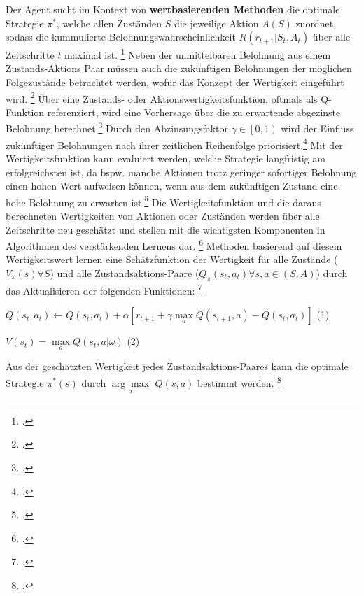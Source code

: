 Der Agent sucht im Kontext von \textbf{wertbasierenden Methoden} die optimale Strategie $\pi^{*}$, welche allen Zuständen $S$ die jeweilige Aktion $A(S)$ zuordnet, sodass die kummulierte Belohnungswahrscheinlichkeit $R(r_{t+1}|S_{t},A_{t})$ über alle Zeitschritte $t$ maximal ist. \footcite[Vgl.][S. 2]{Reda.2020}
Neben der unmittelbaren Belohnung aus einem Zustands-Aktions Paar müssen auch die zukünftigen Belohnungen der möglichen Folgezustände betrachtet werden, wofür das Konzept der Wertigkeit eingeführt wird. \footcite[Vgl.][S. 3]{Wang.2020}
Über eine Zustands- oder Aktionswertigkeitsfunktion, oftmals als Q-Funktion referenziert, wird eine Vorhersage über die zu erwartende abgezinste Belohnung berechnet.\footcite[Vgl.][S. 5]{Li.2019}
Durch den Abzinsungsfaktor $\gamma \in \left[0,1\right)$ wird der Einfluss zukünftiger Belohnungen nach ihrer zeitlichen Reihenfolge priorisiert.\footcite[Vgl][S. 5]{Li.2019}
Mit der Wertigkeitsfunktion kann evaluiert werden, welche Strategie langfristig am erfolgreichsten ist, da bspw. manche Aktionen trotz geringer sofortiger Belohnung einen hohen Wert aufweisen können, wenn aus dem zukünftigen Zustand eine hohe Belohnung zu erwarten ist.\footcite[Vgl.][S. 6]{Sutton.2018}
Die Wertigkeitsfunktion und die daraus berechneten Wertigkeiten von Aktionen oder Zuständen werden über alle Zeitschritte neu geschätzt und stellen mit die wichtigsten Komponenten in Algorithmen des verstärkenden Lernens dar. \footcite[Vgl.][S. 6f.]{Sutton.2018}
Methoden basierend auf diesem Wertigkeitswert lernen eine Schätzfunktion der Wertigkeit für alle Zustände ($V_{\pi}(s) \forall S$) und alle Zustandsaktions-Paare ($Q_{\pi}(s_{t},a_{t}) \forall s,a \in (S,A)$) durch das Aktualisieren der folgenden Funktionen: \footcite[Vgl.][S. 2]{Zhang.2018}
\begin{description}
    \item \begin{center} $Q(s_{t}, a_{t}) \leftarrow Q(s_{t}, a_{t}) + \alpha\left[r_{t+1} + \gamma\max\limits_{a}Q(s_{t+1},a)-Q(s_{t},a_{t})\right]$ (1) \end{center}
    \item \begin{center} $V(s_{t}) = \max\limits_{a}Q(s_{t},a|\omega)$ (2) \end{center}
\end{description}
Aus der geschätzten Wertigkeit jedes Zustandsaktions-Paares kann die optimale Strategie $\pi^{*}(s)$ durch $\underset{a}{\arg\max}$ $Q(s,a)$ bestimmt werden. \footcite[Vgl.][S. 2]{Zhang.2018}

